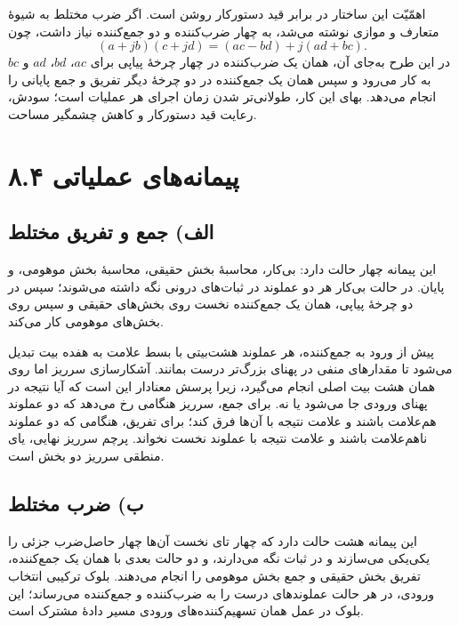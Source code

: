 \documentclass[12pt,a4paper]{article}
\begin{document}

	اهمّیّت این ساختار در برابر قید دستورکار روشن است. اگر ضرب مختلط به شیوهٔ متعارف و موازی نوشته می‌شد، به چهار ضرب‌کننده و دو جمع‌کننده نیاز داشت، چون
	\[
	(a+jb)(c+jd) = (ac-bd) + j(ad+bc).
	\]
	در این طرح به‌جای آن، همان یک ضرب‌کننده در چهار چرخهٔ پیاپی برای \(ac\)، \(bd\)، \(ad\) و \(bc\) به کار می‌رود و سپس همان یک جمع‌کننده در دو چرخهٔ دیگر تفریق و جمع پایانی را انجام می‌دهد. بهای این کار، طولانی‌تر شدن زمان اجرای هر عملیات است؛ سودش، رعایت قید دستورکار و کاهش چشمگیر مساحت.

	\section*{۸.۴ پیمانه‌های عملیاتی}
	\subsection*{الف) جمع و تفریق مختلط}
	این پیمانه چهار حالت دارد: بی‌کار، محاسبهٔ بخش حقیقی، محاسبهٔ بخش موهومی، و پایان. در حالت بی‌کار هر دو عملوند در ثبات‌های درونی نگه داشته می‌شوند؛ سپس در دو چرخهٔ پیاپی، همان یک جمع‌کننده نخست روی بخش‌های حقیقی و سپس روی بخش‌های موهومی کار می‌کند.

	پیش از ورود به جمع‌کننده، هر عملوند هشت‌بیتی با بسط علامت به هفده بیت تبدیل می‌شود تا مقدارهای منفی در پهنای بزرگ‌تر درست بمانند. آشکارسازی سرریز اما روی همان هشت بیت اصلی انجام می‌گیرد، زیرا پرسش معنادار این است که آیا نتیجه در پهنای ورودی جا می‌شود یا نه. برای جمع، سرریز هنگامی رخ می‌دهد که دو عملوند هم‌علامت باشند و علامت نتیجه با آن‌ها فرق کند؛ برای تفریق، هنگامی که دو عملوند ناهم‌علامت باشند و علامت نتیجه با عملوند نخست نخواند. پرچم سرریز نهایی، یای منطقی سرریز دو بخش است.


	\subsection*{ب) ضرب مختلط}
	این پیمانه هشت حالت دارد که چهار تای نخست آن‌ها چهار حاصل‌ضرب جزئی را یکی‌یکی می‌سازند و در ثبات نگه می‌دارند، و دو حالت بعدی با همان یک جمع‌کننده، تفریق بخش حقیقی و جمع بخش موهومی را انجام می‌دهند. بلوک ترکیبی انتخاب ورودی، در هر حالت عملوندهای درست را به ضرب‌کننده و جمع‌کننده می‌رساند؛ این بلوک در عمل همان تسهیم‌کننده‌های ورودی مسیر دادهٔ مشترک است.

\end{document}

